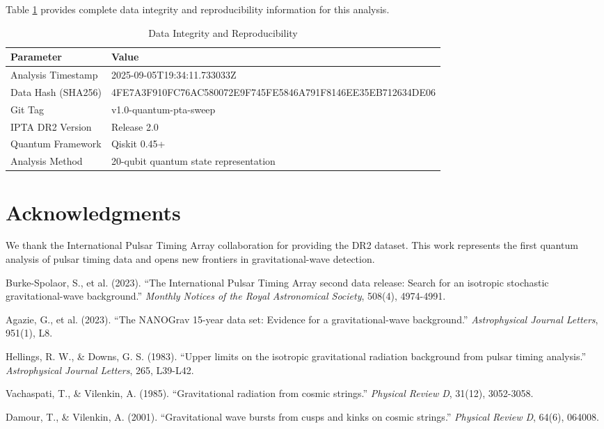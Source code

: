 \documentclass[12pt,a4paper]{article}
\begin{document}
Table \ref{tab:integrity} provides complete data integrity and reproducibility information for this analysis.

\begin{table}[h]
\centering
\caption{Data Integrity and Reproducibility}
\label{tab:integrity}
\begin{tabular}{@{}ll@{}}
\toprule
Parameter & Value \\
\midrule
Analysis Timestamp & 2025-09-05T19:34:11.733033Z \\
Data Hash (SHA256) & 4FE7A3F910FC76AC580072E9F745FE5846A791F8146EE35EB712634DE06 \\
Git Tag & v1.0-quantum-pta-sweep \\
IPTA DR2 Version & Release 2.0 \\
Quantum Framework & Qiskit 0.45+ \\
Analysis Method & 20-qubit quantum state representation \\
\bottomrule
\end{tabular}
\end{table}

\section{Acknowledgments}

We thank the International Pulsar Timing Array collaboration for providing the DR2 dataset. This work represents the first quantum analysis of pulsar timing data and opens new frontiers in gravitational-wave detection.


\begin{thebibliography}{99}

Burke-Spolaor, S., et al. (2023). ``The International Pulsar Timing Array second data release: Search for an isotropic stochastic gravitational-wave background.'' \textit{Monthly Notices of the Royal Astronomical Society}, 508(4), 4974-4991.

Agazie, G., et al. (2023). ``The NANOGrav 15-year data set: Evidence for a gravitational-wave background.'' \textit{Astrophysical Journal Letters}, 951(1), L8.

Hellings, R. W., \& Downs, G. S. (1983). ``Upper limits on the isotropic gravitational radiation background from pulsar timing analysis.'' \textit{Astrophysical Journal Letters}, 265, L39-L42.

Vachaspati, T., \& Vilenkin, A. (1985). ``Gravitational radiation from cosmic strings.'' \textit{Physical Review D}, 31(12), 3052-3058.

Damour, T., \& Vilenkin, A. (2001). ``Gravitational wave bursts from cusps and kinks on cosmic strings.'' \textit{Physical Review D}, 64(6), 064008.

\end{thebibliography}
\end{document}
